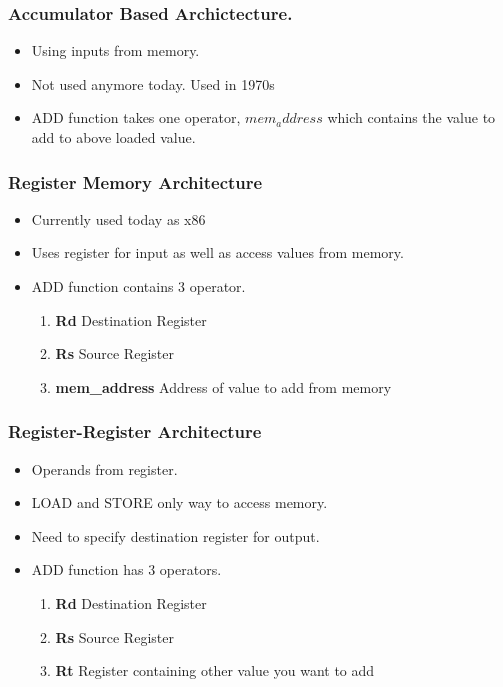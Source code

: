 \documentclass{article}
\begin{document}
		\subsubsection{Accumulator Based Archictecture.}
			\begin{itemize}
				\item Using inputs from memory.
				\item Not used anymore today. Used in 1970s
				\item ADD function takes one operator, $mem_address$ which contains the value to add to above loaded value.
			\end{itemize}

		\subsubsection{Register Memory Architecture}
			\begin{itemize}
				\item Currently used today as x86
				\item Uses register for input as well as access values from memory.
				\item ADD function contains 3 operator.
					\begin{enumerate}
						\item \textbf{Rd} Destination Register
						\item \textbf{Rs} Source Register
						\item \textbf{mem\_address} Address of value to add from memory
					\end{enumerate}
			\end{itemize}

		\subsubsection{Register-Register Architecture}
			\begin{itemize}
				\item Operands from register.
				\item LOAD and STORE only way to access memory.
				\item Need to specify destination register for output.
				\item ADD function has 3 operators.
					\begin{enumerate}
						\item \textbf{Rd} Destination Register
						\item \textbf{Rs} Source Register 
						\item \textbf{Rt} Register containing other value you want to add
					\end{enumerate}
			\end{itemize}
\end{document}
